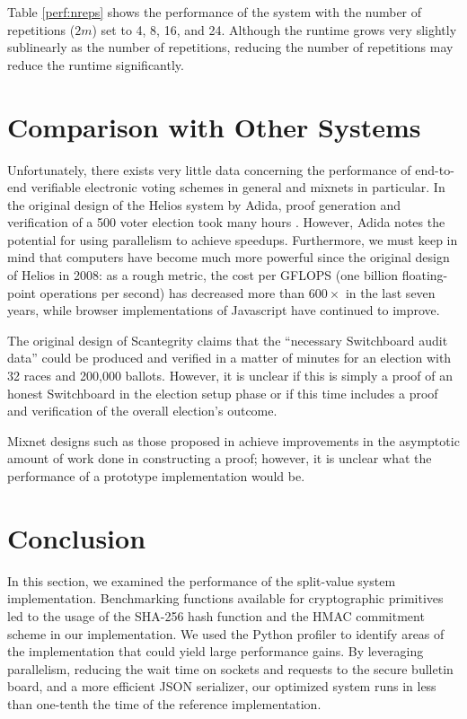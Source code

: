 Table \ref{perf:nreps} shows the performance of the system with the number of repetitions ($2m$) set to 4, 8, 16, and 24. Although the runtime grows very slightly sublinearly as the number of repetitions, reducing the number of repetitions may reduce the runtime significantly.

\section{Comparison with Other Systems} \label{perf:comparison}

Unfortunately, there exists very little data concerning the performance of end-to-end verifiable electronic voting schemes in general and mixnets in particular. In the original design of the Helios system by Adida, proof generation and verification of a 500 voter election took many hours \cite{adida-helios}. However, Adida notes the potential for using parallelism to achieve speedups. Furthermore, we must keep in mind that computers have become much more powerful since the original design of Helios in 2008: as a rough metric, the cost per GFLOPS (one billion floating-point operations per second) has decreased more than $600 \times$ in the last seven years, while browser implementations of Javascript have continued to improve.

The original design of Scantegrity \cite{scantegrity} claims that the ``necessary Switchboard audit data'' could be produced and verified in a matter of minutes for an election with 32 races and 200,000 ballots. However, it is unclear if this is simply a proof of an honest Switchboard in the election setup phase or if this time includes a proof and verification of the overall election's outcome.

Mixnet designs such as those proposed in \cite{chase13} achieve improvements in the asymptotic amount of work done in constructing a proof; however, it is unclear what the performance of a prototype implementation would be.

\section{Conclusion} \label{perf:conclusion}

In this section, we examined the performance of the split-value system implementation. Benchmarking functions available for cryptographic primitives led to the usage of the SHA-256 hash function and the HMAC commitment scheme in our implementation. We used the Python profiler to identify areas of the implementation that could yield large performance gains. By leveraging parallelism, reducing the wait time on sockets and requests to the secure bulletin board, and a more efficient JSON serializer, our optimized system runs in less than one-tenth the time of the reference implementation.

